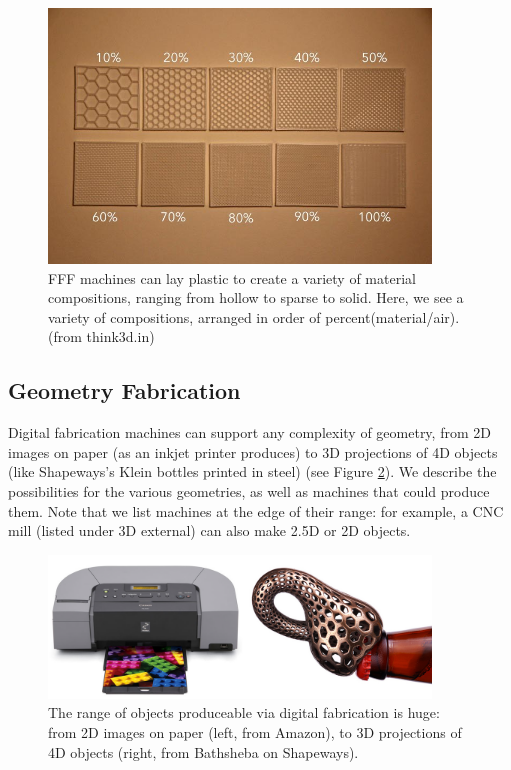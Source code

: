 \begin{figure}
\centering
\includegraphics[width=4in]{figures/infills.jpg}
\caption{FFF machines can lay plastic to create a variety of material compositions, ranging from hollow to sparse to solid. Here, we see a variety of compositions, arranged in order of percent(material/air). (from think3d.in)}
\label{fig:composition}
\end{figure}

\subsection{Geometry Fabrication}

Digital fabrication machines can support any complexity of geometry, from 2D images on paper (as an inkjet printer produces) to 3D projections of 4D objects (like Shapeways's Klein bottles printed in steel) (see Figure \ref{fig:range}). We describe the possibilities for the various geometries, as well as machines that could produce them. Note that we list machines at the edge of their range: for example, a CNC mill (listed under 3D external) can also make 2.5D or 2D objects.

\begin{figure}
\centering
\includegraphics[width=4in]{figures/range.png}
\caption{The range of objects produceable via digital fabrication is huge: from 2D images on paper (left, from Amazon), to 3D projections of 4D objects (right, from Bathsheba on Shapeways).}
\label{fig:range}
\end{figure}

